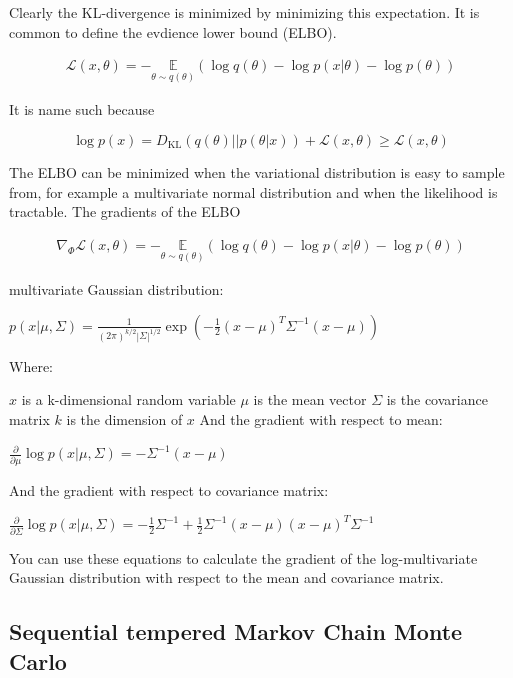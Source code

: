 \documentclass{ucetd}
\begin{document}
Clearly the KL-divergence is minimized by minimizing this expectation. It is common to define the evdience lower bound (ELBO).

\begin{align*}
\mathcal{L}(x,\theta) = - \underset{{\theta \sim q(\theta)}}{\mathbb{E}}\left(\log q(\theta) - \log p(x|\theta) - \log p(\theta) \right)
\end{align*}

It is name such because

\begin{equation*}
\log p(x) = D_{\mathrm{KL}}(q(\theta)||p(\theta|x)) + \mathcal{L}(x,\theta) \geq \mathcal{L}(x,\theta)
\end{equation*}

The ELBO can be minimized when the variational distribution is easy to sample from, for example a multivariate normal distribution and when the likelihood is tractable. The gradients of the ELBO

\begin{align*}
\nabla_{\Phi}\mathcal{L}(x,\theta) = - \underset{{\theta \sim q(\theta)}}{\mathbb{E}}\left(\log q(\theta) - \log p(x|\theta) - \log p(\theta) \right)
\end{align*}

multivariate Gaussian distribution:

$p(x|\mu,\Sigma) = \frac{1}{(2\pi)^{k/2}|\Sigma|^{1/2}}\exp\left(-\frac{1}{2}(x-\mu)^T\Sigma^{-1}(x-\mu)\right)$

Where:

$x$ is a k-dimensional random variable
$\mu$ is the mean vector
$\Sigma$ is the covariance matrix
$k$ is the dimension of $x$
And the gradient with respect to mean:

$\frac{\partial}{\partial \mu} \log p(x|\mu,\Sigma) = -\Sigma^{-1}(x-\mu)$

And the gradient with respect to covariance matrix:

$\frac{\partial}{\partial \Sigma} \log p(x|\mu,\Sigma) = -\frac{1}{2}\Sigma^{-1}+\frac{1}{2}\Sigma^{-1}(x-\mu)(x-\mu)^T\Sigma^{-1}$

You can use these equations to calculate the gradient of the log-multivariate Gaussian distribution with respect to the mean and covariance matrix.

\subsection{Sequential tempered Markov Chain Monte Carlo}
\end{document}
